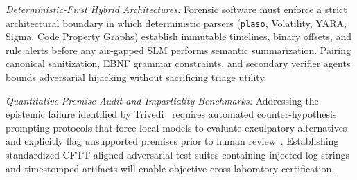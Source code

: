 \textit{Deterministic-First Hybrid Architectures:} Forensic software must enforce a strict architectural boundary in which deterministic parsers (\texttt{plaso}, Volatility, YARA, Sigma, Code Property Graphs) establish immutable timelines, binary offsets, and rule alerts before any air-gapped SLM performs semantic summarization. Pairing canonical sanitization, EBNF grammar constraints, and secondary verifier agents bounds adversarial hijacking without sacrificing triage utility.

\textit{Quantitative Premise-Audit and Impartiality Benchmarks:} Addressing the epistemic failure identified by Trivedi~\cite{trivedi2026_when} requires automated counter-hypothesis prompting protocols that force local models to evaluate exculpatory alternatives and explicitly flag unsupported premises prior to human review~\cite{ko2026_humansupervised}. Establishing standardized CFTT-aligned adversarial test suites containing injected log strings and timestomped artifacts will enable objective cross-laboratory certification.

